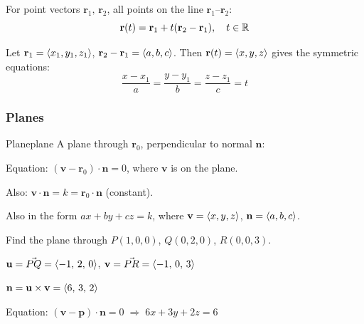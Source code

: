 For point vectors $\mathbf{r}_{1},\,\mathbf{r}_{2}$, all points on the line $\mathbf{r}_{1}$--$\mathbf{r}_{2}$:
\[
  \mathbf{r}(t) = \mathbf{r}_{1} + t(\mathbf{r}_{2}-\mathbf{r}_{1}), \quad t\in\mathbb{R}
\]

Let $\mathbf{r}_{1}=\langle x_{1},y_{1},z_{1} \rangle$,
$\mathbf{r}_{2}-\mathbf{r}_{1}=\langle a,b,c \rangle$.
Then $\mathbf{r}(t)=\langle x,y,z \rangle$ gives the symmetric equations:
\[
  \frac{x-x_{1}}{a} = \frac{y-y_{1}}{b} = \frac{z-z_{1}}{c} = t
\]

\subsubsection{Planes}

\begin{definition}{Plane}{plane}
  A plane through $\mathbf{r}_{0}$, perpendicular to normal $\mathbf{n}$:

  \begin{center}
  \end{center}

  Equation: $(\mathbf{v}-\mathbf{r}_{0})\cdot\mathbf{n} = 0$,
  where $\mathbf{v}$ is on the plane.

  Also: $\mathbf{v}\cdot\mathbf{n} = k = \mathbf{r}_{0}\cdot\mathbf{n}$ (constant).

  Also in the form $ax+by+cz = k$,
  where $\mathbf{v}=\langle x,y,z \rangle$, $\mathbf{n}=\langle a,b,c \rangle$.
\end{definition}

\begin{example}
  Find the plane through $P(1,0,0)$, $Q(0,2,0)$, $R(0,0,3)$.

  $\mathbf{u} = \vec{PQ} = \langle -1,\,2,\,0 \rangle$, \quad
  $\mathbf{v} = \vec{PR} = \langle -1,\,0,\,3 \rangle$

  $\mathbf{n} = \mathbf{u}\times\mathbf{v} = \langle 6,\,3,\,2 \rangle$

  Equation: $(\mathbf{v}-\mathbf{p})\cdot\mathbf{n}=0
    \;\Longrightarrow\; 6x+3y+2z = 6$
\end{example}

